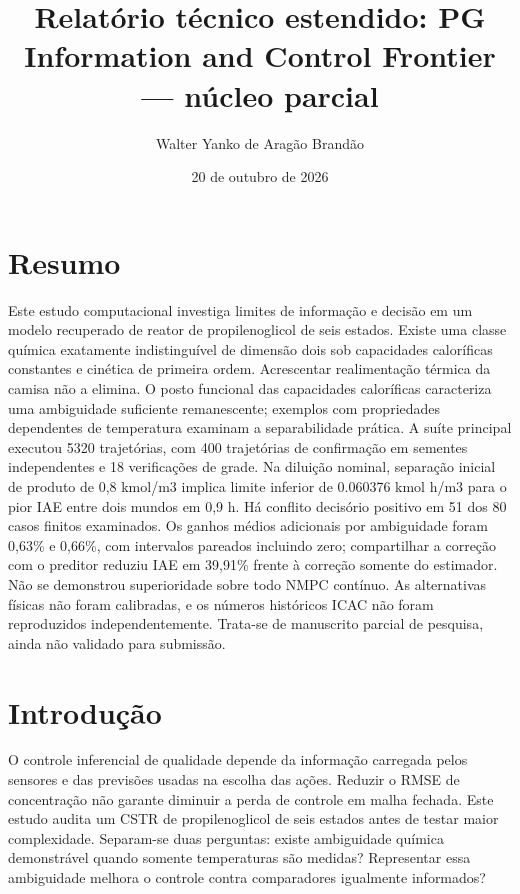 \documentclass[
  11pt,
]{article}
\title{Relatório técnico estendido: PG Information and Control Frontier
--- núcleo parcial}
\author{Walter Yanko de Aragão Brandão}
\date{20 de outubro de 2026}
\begin{document}
\maketitle

\hypertarget{resumo}{%
\section{Resumo}\label{resumo}}

Este estudo computacional investiga limites de informação e decisão em
um modelo recuperado de reator de propilenoglicol de seis estados.
Existe uma classe química exatamente indistinguível de dimensão dois sob
capacidades caloríficas constantes e cinética de primeira ordem.
Acrescentar realimentação térmica da camisa não a elimina. O posto
funcional das capacidades caloríficas caracteriza uma ambiguidade
suficiente remanescente; exemplos com propriedades dependentes de
temperatura examinam a separabilidade prática. A suíte principal
executou 5320 trajetórias, com 400 trajetórias de confirmação em
sementes independentes e 18 verificações de grade. Na diluição nominal,
separação inicial de produto de 0,8 kmol/m3 implica limite inferior de
0.060376 kmol h/m3 para o pior IAE entre dois mundos em 0,9 h. Há
conflito decisório positivo em 51 dos 80 casos finitos examinados. Os
ganhos médios adicionais por ambiguidade foram 0,63\% e 0,66\%, com
intervalos pareados incluindo zero; compartilhar a correção com o
preditor reduziu IAE em 39,91\% frente à correção somente do estimador.
Não se demonstrou superioridade sobre todo NMPC contínuo. As
alternativas físicas não foram calibradas, e os números históricos ICAC
não foram reproduzidos independentemente. Trata-se de manuscrito parcial
de pesquisa, ainda não validado para submissão.

\hypertarget{introduuxe7uxe3o}{%
\section{Introdução}\label{introduuxe7uxe3o}}

O controle inferencial de qualidade depende da informação carregada
pelos sensores e das previsões usadas na escolha das ações. Reduzir o
RMSE de concentração não garante diminuir a perda de controle em malha
fechada. Este estudo audita um CSTR de propilenoglicol de seis estados
antes de testar maior complexidade. Separam-se duas perguntas: existe
ambiguidade química demonstrável quando somente temperaturas são
medidas? Representar essa ambiguidade melhora o controle contra
comparadores igualmente informados?
\end{document}

